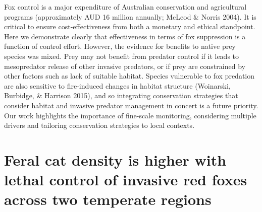 \documentclass[11pt,a4paper,titlepage,twoside,openright]{style/unimelbthesis}
\begin{document}
\begin{mainmatter}
Fox control is a major expenditure of Australian conservation and agricultural programs (approximately AUD 16 million annually; McLeod \& Norris 2004). It is critical to ensure cost-effectiveness from both a monetary and ethical standpoint. Here we demonstrate clearly that effectiveness in terms of fox suppression is a function of control effort. However, the evidence for benefits to native prey species was mixed. Prey may not benefit from predator control if it leads to mesopredator release of other invasive predators, or if prey are constrained by other factors such as lack of suitable habitat. Species vulnerable to fox predation are also sensitive to fire-induced changes in habitat structure (Woinarski, Burbidge, \& Harrison 2015), and so integrating conservation strategies that consider habitat and invasive predator management in concert is a future priority. Our work highlights the importance of fine-scale monitoring, considering multiple drivers and tailoring conservation strategies to local contexts.

\hypertarget{density}{%
\chapter{Feral cat density is higher with lethal control of invasive red foxes across two temperate regions}\label{density}}

\hypertarget{abstract-2}{%
}
\end{mainmatter}
\end{document}
